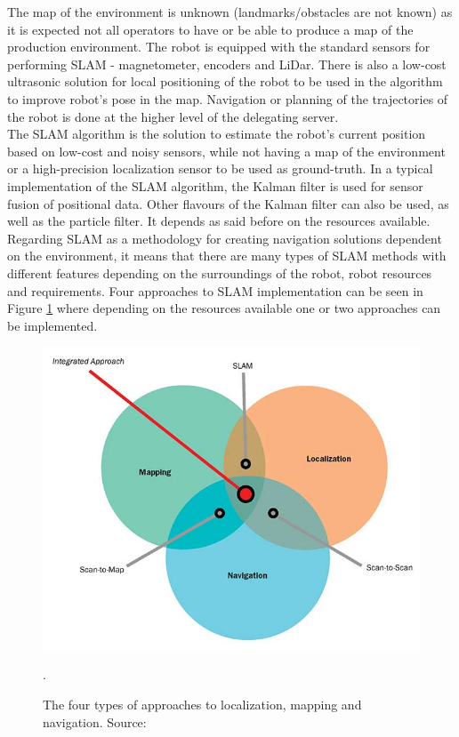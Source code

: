 The map of the environment is unknown (landmarks/obstacles are not known) as it is expected not all operators to have or be able to produce a map of the production environment. The robot is equipped with the standard sensors for performing SLAM - magnetometer, encoders and LiDar. There is also a low-cost ultrasonic solution for local positioning of the robot to be used in the algorithm to improve robot's pose in the map. Navigation or planning of the trajectories of the robot is done at the higher level of the delegating server. \\

The SLAM algorithm is the solution to estimate the robot's current position based on low-cost and noisy sensors, while not having a map of the environment or a high-precision localization sensor to be used as ground-truth. 
In a typical implementation of the SLAM algorithm, the Kalman filter is used for sensor fusion of positional data. Other flavours of the Kalman filter can also be used, as well as the particle filter. It depends as said before on the resources available. Regarding SLAM as a methodology for creating navigation solutions dependent on the environment, it means that there are many types of SLAM methods with different features depending on the surroundings of the robot, robot resources and requirements. Four approaches to SLAM implementation can be seen in Figure \ref{slam} where depending on the resources available one or two approaches can be implemented.

 \begin{figure}[H]
\includegraphics[scale=0.5]{Figures/slam.jpg}
\centering
\caption{The four types of approaches to localization, mapping and navigation. Source: \cite{agv}}.
\label{slam}
\end{figure}

